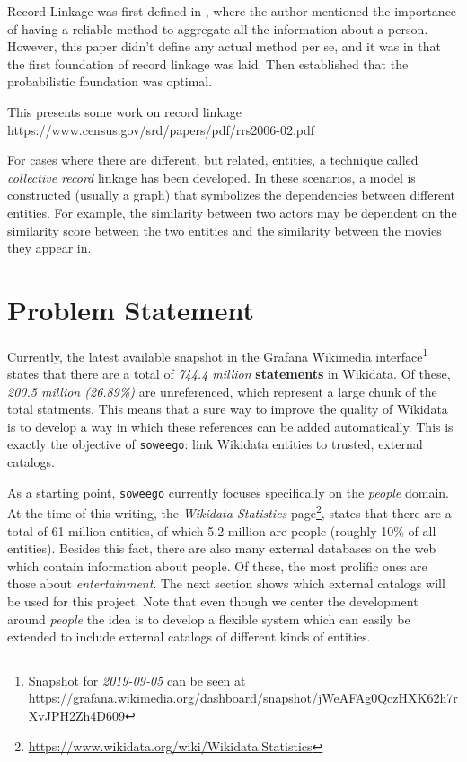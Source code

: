 \documentclass[epsfig,a4paper,11pt,titlepage,twoside,openany]{book}
\newcommand{\footurl}[1]{\footnote{\url{#1}}}
\begin{document}
Record Linkage was first defined in \cite{dunn46_recor_linkag}, where the author
mentioned the importance of having a reliable method to aggregate all the
information about a person. However, this paper didn't define any actual method
per se, and it was in \cite{newcombe59_autom_linkag_vital_recor} that the first
foundation of record linkage was laid. Then \cite{fellegi69_theor_recor_linkag}
established that the probabilistic foundation was optimal. 

This presents some work on record linkage
https://www.census.gov/srd/papers/pdf/rrs2006-02.pdf


For cases where there are different, but related, entities, a technique called \textit{collective record} \cite{Kalashnikov2006_collective_graph,Dong2005_reference_reconciliation,bhattacharya07_collec_entit_resol_relat_data} linkage has been developed. In these scenarios,  a model is constructed (usually a graph) that symbolizes the dependencies between  different entities. For example, the similarity between two actors may be dependent on the similarity score between the two entities and the similarity between the  movies they appear in.


\chapter{Problem Statement}
\label{chap:problem-statement}

Currently, the latest available snapshot in the Grafana Wikimedia interface\footnote{Snapshot for \textit{2019-09-05} can be seen at \url{https://grafana.wikimedia.org/dashboard/snapshot/jWeAFAg0QczHXK62h7rXvJPH2Zh4D609}} states that there are a total of \textit{744.4 million} \textbf{statements} in Wikidata. Of these, \textit{200.5 million (26.89\%)} are unreferenced, which represent a large chunk of the total statments. This means that a sure way to improve the quality of Wikidata is to develop a way in which these references can be added automatically. This is exactly the objective of \texttt{soweego}: link Wikidata entities to trusted, external catalogs.

As a starting point, \texttt{soweego} currently focuses specifically on the \textit{people} domain. At the time of this writing, the \textit{Wikidata Statistics} page\footurl{https://www.wikidata.org/wiki/Wikidata:Statistics}, states that there are a total of 61 million entities, of which 5.2 million are people (roughly 10\% of all entities). Besides this fact, there are also many external databases on the web which contain information about people. Of these, the most prolific ones are those about \textit{entertainment}. The next section shows which external catalogs will be used for this project. Note that even though we center the development around \textit{people} the idea is to develop a flexible system which can easily be extended to include external catalogs of different kinds of entities. 
\end{document}
